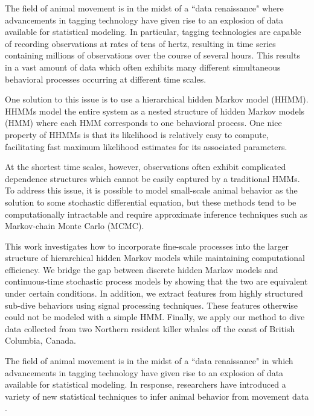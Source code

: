 

The field of animal movement is in the midst of a ``data renaissance" where advancements in tagging technology have given rise to an explosion of data available for statistical modeling. In particular, tagging technologies are capable of recording observations at rates of tens of hertz, resulting in time series containing millions of observations over the course of several hours. This results in a vast amount of data which often exhibits many different simultaneous behavioral processes occurring at different time scales. 

One solution to this issue is to use a hierarchical hidden Markov model (HHMM). HHMMs model the entire system as a nested structure of hidden Markov models (HMM) where each HMM corresponds to one behavioral process. One nice property of HHMMs is that its likelihood is relatively easy to compute, facilitating fast maximum likelihood estimates for its associated parameters.  

At the shortest time scales, however, observations often exhibit complicated dependence structures which cannot be easily captured by a traditional HMMs. To address this issue, it is possible to model small-scale animal behavior as the solution to some stochastic differential equation, but these methods tend to be computationally intractable and require approximate inference techniques such as Markov-chain Monte Carlo (MCMC).

This work investigates how to incorporate fine-scale processes into the larger structure of hierarchical hidden Markov models while maintaining computational efficiency. We bridge the gap between discrete hidden Markov models and continuous-time stochastic process models by showing that the two are equivalent under certain conditions. In addition, we extract features from highly structured sub-dive behaviors using signal processing techniques. These features otherwise could not be modeled with a simple HMM. Finally, we apply our method to dive data collected from two Northern resident killer whales off the coast of British Columbia, Canada.

The field of animal movement is in the midst of a ``data renaissance" in which advancements in tagging technology have given rise to an explosion of data available for statistical modeling. In response, researchers have introduced a variety of new statistical techniques to infer animal behavior from movement data \cite{Hooten:2017}. 

